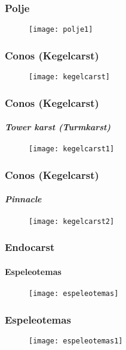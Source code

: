 \documentclass{beamer}
\begin{document}
\begin{frame}
\frametitle{Polje}
\begin{figure}
\begin{center}
   	\texttt{[image: polje1]}
\end{center}
\end{figure}
\end{frame}
\begin{frame}
\frametitle{Conos (Kegelcarst)}
\begin{figure}
\begin{center}
   	\texttt{[image: kegelcarst]}
\end{center}
\end{figure}
\end{frame}
\begin{frame}
\frametitle{Conos (Kegelcarst)}
\framesubtitle{\emph{Tower karst (Turmkarst)}}
\begin{figure}
\begin{center}
   	\texttt{[image: kegelcarst1]}
\end{center}
\end{figure}
\end{frame}
\begin{frame}
\frametitle{Conos (Kegelcarst)}
\framesubtitle{\emph{Pinnacle}}
\begin{figure}
\begin{center}
   	\texttt{[image: kegelcarst2]}
\end{center}
\end{figure}
\end{frame}
\begin{frame}
\frametitle{Endocarst}
\framesubtitle{Espeleotemas}
\begin{figure}
\begin{center}
   	\texttt{[image: espeleotemas]}
\end{center}
\end{figure}
\end{frame}
\begin{frame}
\frametitle{Espeleotemas}
\begin{figure}
\begin{center}
   	\texttt{[image: espeleotemas1]}
\end{center}
\end{figure}
\end{frame}
\end{document}
